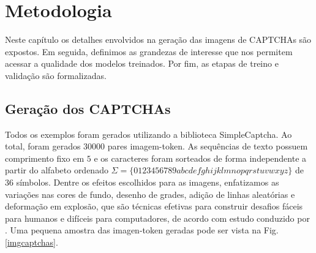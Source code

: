 \chapter{Metodologia} \label{metodologia}

Neste capítulo os detalhes envolvidos na geração das imagens de CAPTCHAs são expostos. Em seguida, definimos as grandezas de interesse que nos permitem acessar a qualidade dos modelos treinados. Por fim, as etapas de treino e validação são formalizadas.


\section{Geração dos CAPTCHAs}

Todos os exemplos foram gerados utilizando a biblioteca SimpleCaptcha\cite{simplecaptcha}. Ao total, foram gerados $30000$ pares imagem-token.
As sequências de texto possuem comprimento fixo em $5$ e os caracteres foram sorteados de forma independente a partir do alfabeto ordenado $\Sigma = \{0123456789abcdefghijklmnopqrstuvwxyz\}$ de $36$ símbolos. Dentre os efeitos escolhidos para as imagens, enfatizamos as variações nas cores de fundo, desenho de grades, adição de linhas aleatórias e deformação em explosão, que são técnicas efetivas para construir desafios fáceis para humanos e difíceis para computadores, de acordo com estudo conduzido por \cite{lectures2005HIP}. Uma pequena amostra das imagen-token geradas pode ser vista na Fig.\ref{imgcaptchas}. 

